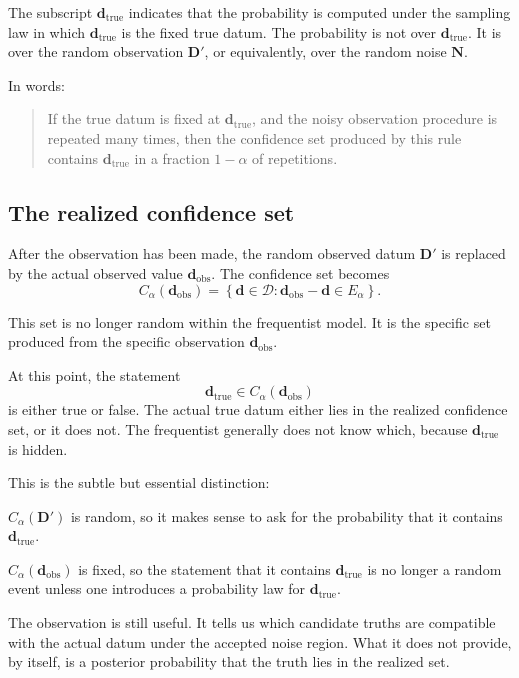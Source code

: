 \documentclass[11pt]{article}
\newcommand{\Dspace}{\mathcal D}
\newcommand{\Dobsrand}{\mathbf D'}
\newcommand{\Nrand}{\mathbf N}
\newcommand{\dtrue}{\mathbf d_{\mathrm{true}}}
\newcommand{\dobs}{\mathbf d_{\mathrm{obs}}}
\newcommand{\Ealpha}{E_{\alpha}}
\newcommand{\Calpha}{C_{\alpha}}
\begin{document}
The subscript \(\dtrue\) indicates that the probability is computed under the sampling law in which \(\dtrue\) is the fixed true datum. The probability is not over \(\dtrue\). It is over the random observation \(\Dobsrand\), or equivalently, over the random noise \(\Nrand\).

In words:
\begin{quote}
    If the true datum is fixed at \(\dtrue\), and the noisy observation procedure is repeated many times, then the confidence set produced by this rule contains \(\dtrue\) in a fraction \(1-\alpha\) of repetitions.
\end{quote}

\subsection{The realized confidence set}

After the observation has been made, the random observed datum \(\Dobsrand\) is replaced by the actual observed value \(\dobs\). The confidence set becomes
\[
    \Calpha(\dobs)
    =
    \left\{
        \mathbf d\in\Dspace:
        \dobs-\mathbf d\in\Ealpha
    \right\}.
\]

This set is no longer random within the frequentist model. It is the specific set produced from the specific observation \(\dobs\).

At this point, the statement
\[
    \dtrue\in\Calpha(\dobs)
\]
is either true or false. The actual true datum either lies in the realized confidence set, or it does not. The frequentist generally does not know which, because \(\dtrue\) is hidden.

This is the subtle but essential distinction:
\begin{description}[leftmargin=3.4cm,style=nextline]
    \item[Before observation.]
    \(\Calpha(\Dobsrand)\) is random, so it makes sense to ask for the probability that it contains \(\dtrue\).

    \item[After observation.]
    \(\Calpha(\dobs)\) is fixed, so the statement that it contains \(\dtrue\) is no longer a random event unless one introduces a probability law for \(\dtrue\).
\end{description}

The observation is still useful. It tells us which candidate truths are compatible with the actual datum under the accepted noise region. What it does not provide, by itself, is a posterior probability that the truth lies in the realized set.
\end{document}
